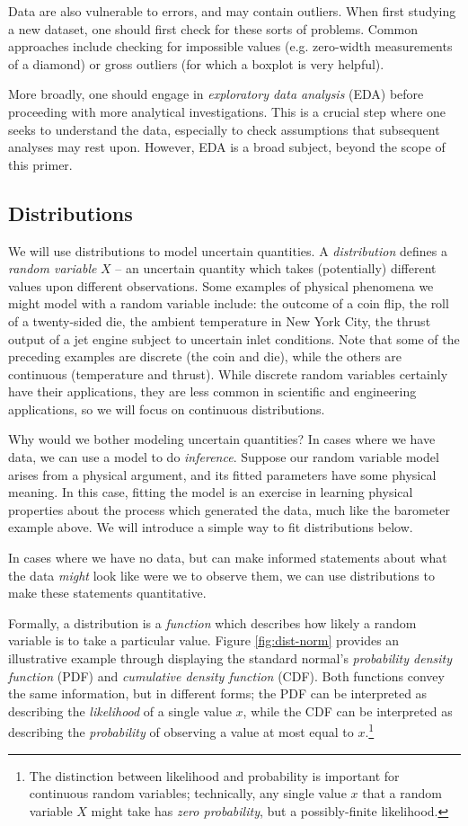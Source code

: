 \documentclass[../primer.tex]{subfiles}
\begin{document}
Data are also vulnerable to errors, and may contain outliers. When first
studying a new dataset, one should first check for these sorts of problems.
Common approaches include checking for impossible values (e.g. zero-width
measurements of a diamond) or gross outliers (for which a boxplot is very
helpful).

More broadly, one should engage in \emph{exploratory data analysis} (EDA) before
proceeding with more analytical investigations.\cite{tukey1977eda} This is a
crucial step where one seeks to understand the data, especially to check
assumptions that subsequent analyses may rest upon. However, EDA is a broad
subject, beyond the scope of this primer.

\subsection{Distributions}
We will use distributions to model uncertain quantities. A \emph{distribution}
defines a \emph{random variable} $X$ -- an uncertain quantity which takes
(potentially) different values upon different observations. Some examples of
physical phenomena we might model with a random variable include: the outcome of
a coin flip, the roll of a twenty-sided die, the ambient temperature in New York
City, the thrust output of a jet engine subject to uncertain inlet conditions.
Note that some of the preceding examples are discrete (the coin and die), while
the others are continuous (temperature and thrust). While discrete random
variables certainly have their applications, they are less common in scientific
and engineering applications, so we will focus on continuous distributions.

Why would we bother modeling uncertain quantities? In cases where we have data,
we can use a model to do \emph{inference}. Suppose our random variable model
arises from a physical argument, and its fitted parameters have some physical
meaning. In this case, fitting the model is an exercise in learning physical
properties about the process which generated the data, much like the barometer
example above. We will introduce a simple way to fit distributions below.

In cases where we have no data, but can make informed statements about what the
data \emph{might} look like were we to observe them, we can use distributions to
make these statements quantitative.

Formally, a distribution is a \emph{function} which describes how likely a
random variable is to take a particular value. Figure \ref{fig:dist-norm}
provides an illustrative example through displaying the standard normal's
\emph{probability density function} (PDF) and \emph{cumulative density function}
(CDF). Both functions convey the same information, but in different forms; the
PDF can be interpreted as describing the \emph{likelihood} of a single value
$x$, while the CDF can be interpreted as describing the \emph{probability} of
observing a value at most equal to $x$.\footnote{The distinction between
  likelihood and probability is important for continuous random variables;
  technically, any single value $x$ that a random variable $X$ might take has
  \emph{zero probability}, but a possibly-finite likelihood.}
\end{document}
